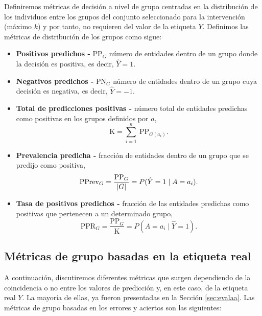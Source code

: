 \documentclass[oneside,openright,titlepage,numbers=noenddot,openany,headinclude,footinclude=true,
cleardoublepage=empty,abstractoff,BCOR=5mm,paper=a4,fontsize=12pt,main=spanish]{scrreprt}
\begin{document}
Definiremos métricas de decisión a nivel de grupo centradas en la distribución de los individuos entre los grupos del conjunto seleccionado para la intervención (máximo $k$) y por
tanto, no requieren del valor de la etiqueta $Y$. Definimos las métricas de distribución de los grupos como sigue:

\begin{itemize}
    \item \textbf{Positivos predichos -} PP$_G$ número de entidades dentro de un grupo donde la decisión es positiva, es decir, $\hat{Y} = 1$.
    \item \textbf{Negativos predichos -} PN$_G$ número de entidades dentro de un grupo cuya decisión es negativa, es decir, $\hat{Y} = -1$.
    \item \textbf{Total de predicciones positivas -} número total de entidades predichas como positivas en los grupos definidos por $a$, $$\text{K} = \sum_{i=1}^{n} \  \text{PP}_{G(a_i)}.$$
    \item \textbf{Prevalencia predicha -} fracción de entidades dentro de un grupo que se predijo como positiva, $$\text{PPrev}_G = \frac{\text{PP}_G}{\left\lvert G\right\rvert} = P(\hat{Y}=1 \mid A=a_i).$$
    \item \textbf{Tasa de positivos predichos -} fracción de las entidades predichas como positivas que pertenecen a un determinado grupo, $$\text{PPR}_G = \frac{\text{PP}_G}{\text{K}} = P(A=a_i \mid \hat{Y}=1).$$
\end{itemize}

\subsection*{Métricas de grupo basadas en la etiqueta real}

\label{subsec:groupmetrics}

A continuación, discutiremos diferentes métricas que surgen dependiendo de la coincidencia o no entre los valores de predicción y, en este caso, de la etiqueta real $Y$. La mayoría de ellas, ya fueron presentadas en la Sección \ref{sec:evalaa}. Las métricas de grupo basadas en los errores y aciertos son las siguientes:
\end{document}
